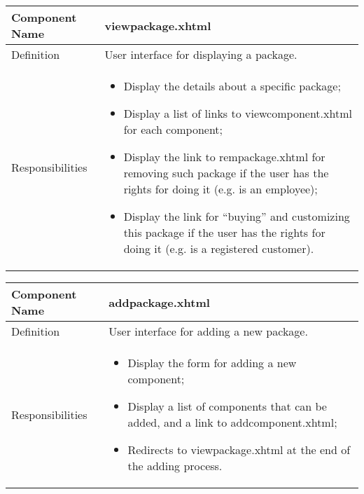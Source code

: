 \documentclass[a4paper,12pt]{book}
\begin{document}
\begin{center}
  \begin{tabular}{ | p{3.3cm} | p{11.7cm} | }
    \hline
    Component Name & \textbf{viewpackage.xhtml} \\ \hline
    Definition & User interface for displaying a package. \\ \hline
    Responsibilities & \parbox{0.65\textwidth}{
      \begin{itemize}[noitemsep,leftmargin=*]
        \item Display the details about a specific package;
        \item Display a list of links to viewcomponent.xhtml for each component;
        \item Display the link to rempackage.xhtml for removing such package if the user has the rights for doing it (e.g. is an employee);
        \item Display the link for ``buying'' and customizing this package if the user has the rights for doing it (e.g. is a registered customer).
      \end{itemize}} \\ \hline
    \end{tabular}
  \end{center}
  \begin{center}
    \begin{tabular}{ | p{3.3cm} | p{11.7cm} | }
      \hline
      Component Name & \textbf{addpackage.xhtml} \\ \hline
      Definition & User interface for adding a new package. \\ \hline
      Responsibilities & \parbox{0.65\textwidth}{
        \begin{itemize}[noitemsep,leftmargin=*]
          \item Display the form for adding a new component;
          \item Display a list of components that can be added, and a link to addcomponent.xhtml;
          \item Redirects to viewpackage.xhtml at the end of the adding process.
        \end{itemize}} \\ \hline
      \end{tabular}
    \end{center}
\end{document}
